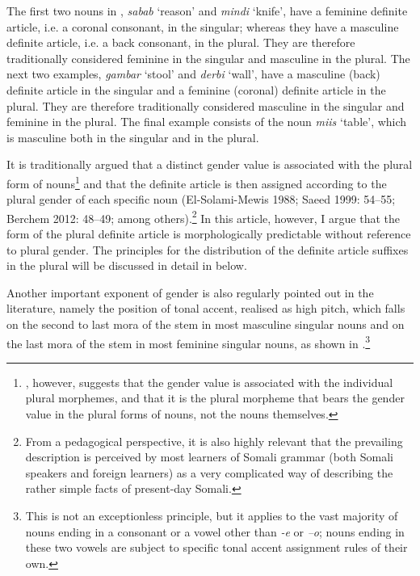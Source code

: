\documentclass[output=paper]{langsci/langscibook}
\begin{document}
The first two nouns in , \textit{sabab }‘reason’ and \textit{mindi} ‘knife’, have a feminine definite article, i.e. a coronal consonant, in the singular; whereas they have a masculine definite article, i.e. a back consonant, in the plural. They are therefore traditionally considered feminine in the singular and masculine in the plural. The next two examples, \textit{gambar} ‘stool’ and \textit{derbi} ‘wall’, have a masculine (back) definite article in the singular and a feminine (coronal) definite article in the plural. They are therefore traditionally considered masculine in the singular and feminine in the plural. The final example consists of the noun \textit{miis} ‘table’, which is masculine both in the singular and in the plural.

It is traditionally argued that a distinct gender value is associated with the plural form of nouns\footnote{\citet{Lecarme2002}, however, suggests that the gender value is associated with the individual plural morphemes, and that it is the plural morpheme that bears the gender value in the plural forms of nouns, not the nouns themselves.} and that the definite article is then assigned according to the plural gender of each specific noun (El-Solami-Mewis 1988; Saeed 1999: 54{}--55; Berchem 2012: 48{}--49; among others).\footnote{From a pedagogical perspective, it is also highly relevant that the prevailing description is perceived by most learners of Somali grammar (both Somali speakers and foreign learners) as a very complicated way of describing the rather simple facts of present-day Somali.}  In this article, however, I argue that the form of the plural definite article is morphologically predictable without reference to plural gender. The principles for the distribution of the definite article suffixes in the plural will be discussed in detail in  below.

Another important exponent of gender is also regularly pointed out in the literature, namely the position of tonal accent, realised as high pitch, which falls on the second to last mora of the stem in most masculine singular nouns and on the last mora of the stem in most feminine singular nouns, as shown in .\footnote{This is not an exceptionless principle, but it applies to the vast majority of nouns ending in a consonant or a vowel other than \textit{{}-e} or \textit{–o}; nouns ending in these two vowels are subject to specific tonal accent assignment rules of their own.}
 
\end{document}
